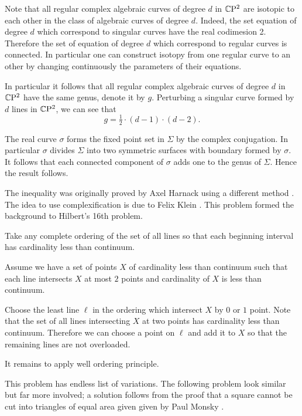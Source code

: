 Note that all regular complex algebraic curves of degree $d$ in $\mathbb{C}\mathrm{P}^2$
are isotopic to each other in the class of algebraic curves of degree $d$.
Indeed, the set equation of degree $d$ which correspond to singular curves have the real codimesion 2.
Therefore the set of equation of degree $d$ which correspond to regular curves is connected.
In particular one can construct isotopy from one regular curve to an other by changing continuously the parameters of their equations.

In particular it follows that all regular complex algebraic curves of degree $d$ in $\mathbb{C}\mathrm{P}^2$ have the same genus,
denote it by $g$.
Perturbing a singular curve formed by $d$ lines in $\mathbb{C}\mathrm{P}^2$,
we can see that 
\[g=\tfrac12\cdot(d-1)\cdot(d-2).\]

The real curve $\sigma$ forms the fixed point set in $\Sigma$ 
by the complex conjugation. 
In particular $\sigma$ divides $\Sigma$ into two symmetric surfaces with boundary formed by $\sigma$.
It follows that each connected component of $\sigma$ adds one to the genus of $\Sigma$.
Hence the result follows.
\qeds
 
The inequality was originally proved 
by Axel Harnack using a different method \cite[see][]{harnack}.
The idea to use complexification is due to Felix Klein \cite[see][]{klein}.
This problem formed the background to Hilbert's 16th problem. 






Take any complete ordering of the set of all lines 
so that each beginning interval has cardinality less than continuum.

Assume we have a set of points $X$ of cardinality less than continuum such that each line intersects $X$ at most $2$ points and cardinality of $X$ is less than continuum.

Choose the least line $\ell$ in the ordering which intersect $X$ 
by $0$ or $1$ point.
Note that the set of all lines intersecting $X$ at two points has cardinality less than continuum.
Therefore we can choose a point on $\ell$ and add it to $X$ so that the remaining lines are not overloaded.

It remains to apply well ordering principle.
\qeds

This problem has endless list of variations.
The following problem look similar but far more involved;
a solution follows from the proof that a square cannot be cut into triangles of equal area given given by Paul Monsky \cite[see][]{monsky}.

